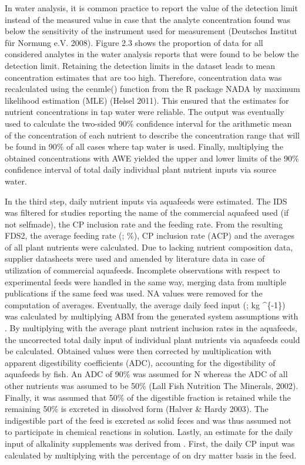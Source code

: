 \documentclass[preprint, 3p,
authoryear]{elsarticle} %
\begin{document}
In water analysis, it is common practice to report the value of the
detection limit instead of the measured value in case that the analyte
concentration found was below the sensitivity of the instrument used for
measurement (Deutsches Institut für Normung e.V. 2008). Figure 2.3 shows
the proportion of data for all considered analytes in the water analysis
reports that were found to be below the detection limit. Retaining the
detection limits in the dataset leads to mean concentration estimates
that are too high. Therefore, concentration data was recalculated using
the cenmle() function from the R package NADA by maximum likelihood
estimation (MLE) (Helsel 2011). This ensured that the estimates for
nutrient concentrations in tap water were reliable. The output was
eventually used to calculate the two-sided 90\% confidence interval for
the arithmetic mean of the concentration of each nutrient to describe
the concentration range that will be found in 90\% of all cases where
tap water is used. Finally, multiplying the obtained concentrations with
AWE yielded the upper and lower limits of the 90\% confidence interval
of total daily individual plant nutrient inputs via source water.

In the third step, daily nutrient inputs via aquafeeds were estimated.
The IDS was filtered for studies reporting the name of the commercial
aquafeed used (if not selfmade), the CP inclusion rate and the feeding
rate. From the resulting FDS2, the average feeding rate (;
\%), CP inclusion rate (ACP) and the averages of all plant nutrients
were calculated. Due to lacking nutrient composition data, supplier
datasheets were used and amended by literature data in case of
utilization of commercial aquafeeds. Incomplete observations with
respect to experimental feeds were handled in the same way, merging data
from multiple publications if the same feed was used. NA values were
removed for the computation of averages. Eventually, the average daily
feed input (; kg \^{}\{-1\}) was calculated by
multiplying ABM from the generated system assumptions with . By
multiplying  with the average plant nutrient inclusion rates
in the aquafeeds, the uncorrected total daily input of individual plant
nutrients via aquafeeds could be calculated. Obtained values were then
corrected by multiplication with apparent digestibility coefficients
(ADC), accounting for the digestibility of aquafeeds by fish. An ADC of
90\% was assumed for N whereas the ADC of all other nutrients was
assumed to be 50\% (Lall Fish Nutrition The Minerals, 2002). Finally, it
was assumed that 50\% of the digestible fraction is retained while the
remaining 50\% is excreted in dissolved form (Halver \& Hardy 2003). The
indigestible part of the feed is excreted as solid feces and was thus
assumed not to participate in chemical reactions in solution. Lastly, an
estimate for the daily input of alkalinity supplements was derived from
. First, the daily CP input was calculated by multiplying
 with the percentage of  on dry matter basis in
the feed.
\end{document}
